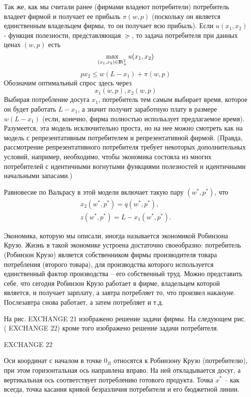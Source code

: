 {Так же, как мы считали ранее (фирмами владеют потребители)
потребитель владеет фирмой и получает ее прибыль $\pi(w,p)$
(поскольку он является единственным владельцем фирмы, то он получает
всю прибыль). Если $u(x_1,x_2)$ - функция полезности, представляющая
$\succeq$, то задача потребителя при данных ценах $(w,p)$ есть
$$
\max_{(x_1,x_2)\in{\rm I\!R}^2_+}u(x_1,x_2)
$$
$$
px_2\le w(L-x_1)+\pi (w,p)
$$
Обозначим оптимальный спрос здесь через
$$
x_1(w,p),x_2(w,p)
$$
Выбирая потребление досуга $x_1$, потребитель тем самым выбирает
время, которое он будет работать $L-x_1$, а значит получит
заработную плату в размере $w(L-x_1)$ (если, конечно, фирма полностью
исполььзует предлагаемое время).
Разумеется, эта модель исключительно проста, но на нее можно смотреть как на
модель с репрезентативным потребителем и репрезентативной фирмой. (Правда, рассмотрение
репрезентативного потребителя требует некоторых дополнительных условий, например,
необходимо, чтобы экономика состояла из многих потребителей с
идентичными вогнутыми функциями полезностей и идентичными начальными запасами.)

Равновесие по Вальрасу в этой модели включает такую пару
$(w^*,p^*)$, что
$$
\begin{array}{c}
x_2(w^*,p^*)=q(w^*,p^*),\\
z(w^*,p^*)=L-x_1(w^*,p^*).
\end{array}
$$

Экономика, которую мы описали,  иногда называется экономикой
Робинзона Крузо. Жизнь в такой экономике устроена достаточно
своеобразно: потребитель (Робинзон Крузо) является собственником
фирмы производителя товара потребления (второго товара), для
производства которого используется единственный фактор производства
-- его собственный труд. Можно представить себе, что сегодня
Робинзон Крузо работает в фирме, владельцем которой является, и
получает зарплату, а завтра потребляет то, что произвел накануне.
Послезавтра снова работает, а затем потребляет и т.д.

На рис. EXCHANGE 21 изображено решение задачи фирмы. На следующем
рис. ( EXCHANGE 22) кроме того изображено решение задачи
потребителя.

EXCHANGE 22

Оси координат с началом в точке $0_R$ относятся к Робинзону Крузо
(потребителю), при этом горизонтальная ось направлена вправо. На ней
откладывается досуг, а вертикальная ось соответствует потреблению
готового продукта. Точка $x^*$ -- как всегда, точка касания кривой
безразличия потребителя и его бюджетной линии.

}
